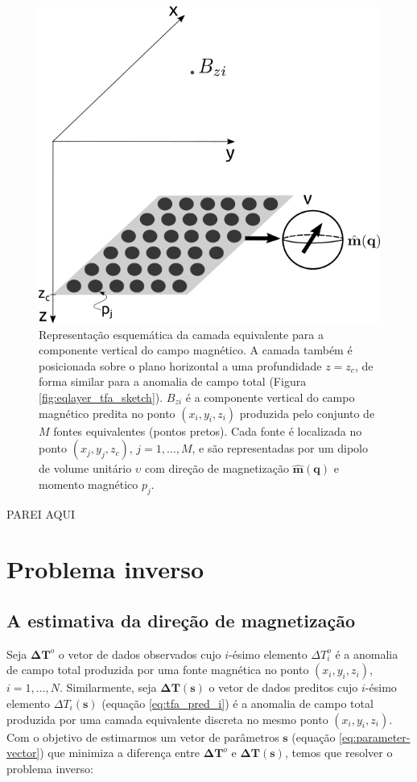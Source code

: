 \begin{figure}[H]
	\centering
	\includegraphics[width=.7\textwidth]{Fig/mag_vec/eqlayer_figure_bz.png}
	\caption{Representação esquemática da camada equivalente para a componente vertical do campo magnético. A camada também é posicionada sobre o plano horizontal a uma profundidade $z=z_c$, de forma similar para a anomalia de campo total (Figura \ref{fig:eqlayer_tfa_sketch}). $B_{zi}$ é a componente vertical do campo magnético predita no ponto $(x_i,y_i,z_i)$ produzida pelo conjunto de $M$ fontes equivalentes (pontos pretos). Cada fonte é localizada no ponto  $(x_j,y_j,z_c)$, $j = 1,\hdots, M$, e são representadas por um dipolo de volume unitário $\upsilon$ com direção de magnetização $\hat{\mathbf{m}}(\mathbf{q})$ e momento magnético $p_j$.}
	\label{fig:eqlayer_bz_sketch}
\end{figure}

PAREI AQUI

\section{Problema inverso}

\subsection{A estimativa da direção de magnetização}
\label{subsec:mag_dir_est}

Seja $\mathbf{\Delta T}^{o}$ o vetor de dados observados cujo $i$-ésimo elemento $\Delta T_{i}^{o}$ é a anomalia de campo total produzida por uma fonte magnética no ponto $(x_{i},y_{i},z_{i})$, $i = 1, \dots, N$. Similarmente, seja $\mathbf{\Delta T} (\mathbf{s})$ o vetor de dados preditos cujo $i$-ésimo elemento $\Delta T_{i}(\mathbf{s})$ (equação \ref{eq:tfa_pred_i}) é a anomalia de campo total produzida por uma camada equivalente discreta no mesmo ponto $(x_{i},y_{i},z_{i})$. Com o objetivo de estimarmos um vetor de parâmetros $\mathbf{s}$ (equação \ref{eq:parameter-vector}) que minimiza a diferença entre $\mathbf{\Delta T}^{o}$ e $\mathbf{\Delta T}(\mathbf{s})$, temos que resolver o problema inverso:

